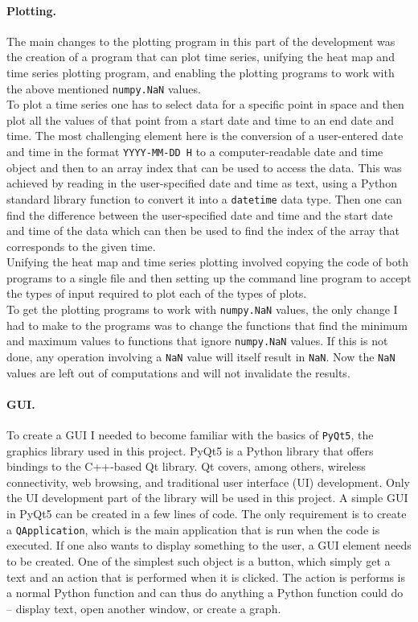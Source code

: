 \documentclass[../00_main.tex]{subfiles}
\begin{document}
\paragraph{Plotting.}

The main changes to the plotting program in this part of the development was
the creation of a program that can plot time series, unifying the heat map and
time series plotting program, and enabling the plotting programs to work with
the above mentioned \texttt{numpy.NaN} values.\\
To plot a time series one has to select data for a specific point in space and
then plot all the values of that point from a start date and time to an end
date and time. The most challenging element here is the conversion of
a user-entered date and time in the format \texttt{YYYY-MM-DD H} to
a computer-readable date and time object and then to an array index that can be
used to access the data. This was achieved by reading in the user-specified
date and time as text, using a Python standard library function to convert it
into a \texttt{datetime} data type. Then one can find the difference between
the user-specified date and time and the start date and time of the data which
can then be used to find the index of the array that corresponds to the given
time. \\
Unifying the heat map and time series plotting involved copying the code of
both programs to a single file and then setting up the command line program to
accept the types of input required to plot each of the types of plots.\\
To get the plotting programs to work with \texttt{numpy.NaN} values, the only
change I had to make to the programs was to change the functions that find the
minimum and maximum values to functions that ignore \texttt{numpy.NaN} values.
If this is not done, any operation involving a \texttt{NaN} value will itself
result in \texttt{NaN}. Now the \texttt{NaN} values are left out of
computations and will not invalidate the results.

\paragraph{GUI.}

To create a GUI I needed to become familiar with the basics of \texttt{PyQt5},
the graphics library used in this project. PyQt5 is a Python library that
offers bindings to the C++-based Qt library. Qt covers, among others, wireless 
connectivity, web browsing, and traditional user interface (UI) development. 
Only the UI development part of the library will be used in this project.
A simple GUI in PyQt5 can be created in a few lines of code. The only
requirement is to create a \texttt{QApplication}, which is the main application
that is run when the code is executed. If one also wants to display something
to the user, a GUI element needs to be created. One of the simplest such object
is a button, which simply get a text and an action that is performed when it is
clicked. The action is performs is a normal Python function and can thus do
anything a Python function could do -- display text, open another window, or
create a graph.
\end{document}
